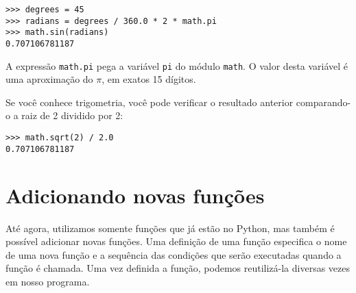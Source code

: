 \beforeverb
\begin{verbatim}
>>> degrees = 45
>>> radians = degrees / 360.0 * 2 * math.pi
>>> math.sin(radians)
0.707106781187
\end{verbatim}
\afterverb
%
%
A expressão {\tt math.pi} pega a variável {\tt pi} do módulo {\tt math}. O
valor desta variável é uma aproximação do $\pi$, em exatos 15 dígitos.



Se você conhece trigometria, você pode verificar o resultado anterior
comparando-o a raiz de 2 dividido por 2:


\beforeverb
\begin{verbatim}
>>> math.sqrt(2) / 2.0
0.707106781187
\end{verbatim}
\afterverb
%


\section{Adicionando novas funções}


Até agora, utilizamos somente funções que já estão no Python, mas também é
possível adicionar novas funções. Uma definição de uma função especifica o
nome de uma nova função e a sequência das condições que serão executadas
quando a função é chamada. Uma vez definida a função, podemos reutilizá-la
diversas vezes em nosso programa.



